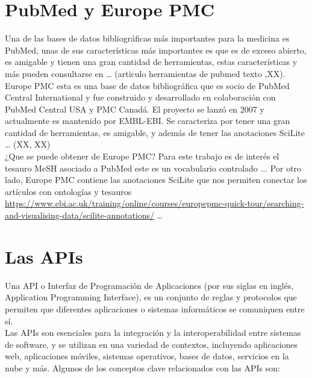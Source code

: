 \documentclass[../Main.tex]{subfiles}
\begin{document}
\section{PubMed y Europe PMC}
\noindent
Una de las bases de datos bibliográficas más importantes para la medicina es PubMed, unas de sus características más importantes es que es de exceso abierto, es amigable y tienen una gran cantidad de herramientas, estas características y más pueden consultarse en … (articulo herramientas de pubmed texto ,XX).\\
 
Europe PMC esta es una base de datos bibliográfica que es socio de  PubMed Central International  y fue construido y desarrollado en colaboración con PubMed Central USA y PMC Canadá. El proyecto se lanzó en 2007 y actualmente es mantenido por EMBL-EBI. Se caracteriza por tener una gran cantidad de herramientas, es amigable, y además de tener las anotaciones SciLite … (XX, XX)\\

¿Que se puede obtener de Europe PMC?
Para este trabajo es de interés el tesauro MeSH asociado a PubMed este es un vocabulario controlado ... 
Por otro lado, Europe PMC contiene las anotaciones SciLite que nos permiten conectar los artículos con ontologías y tesauros \url{https://www.ebi.ac.uk/training/online/courses/europepmc-quick-tour/searching-and-visualising-data/scilite-annotations/} … \\

\section{Las APIs}
\noindent
Una API o Interfaz de Programación de Aplicaciones (por sus siglas en inglés, Application Programming Interface), es un conjunto de reglas y protocolos que permiten que diferentes aplicaciones o sistemas informáticos se comuniquen entre sí.\\
 Las APIs son esenciales para la integración y la interoperabilidad entre sistemas de software, y se utilizan en una variedad de contextos, incluyendo aplicaciones web, aplicaciones móviles, sistemas operativos, bases de datos, servicios en la nube y más. Algunos de los conceptos clave relacionados con las APIs son: \\
 
\end{document}

